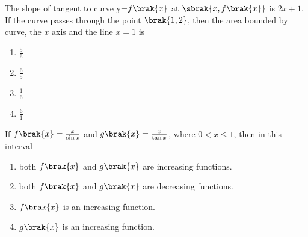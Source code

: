 \iffalse
  \title{Assignment-1}
  \author{Shivam Shilvant}
  \section{mcq-single}
\fi
\item The slope of tangent to curve y=$f\brak{x}$ at $\sbrak{x,f\brak{x}}$ is $2x + 1$. If the curve passes through the point $\brak{1,2}$, then the area bounded by curve, the $x$ axis and the line $x=1$ is
\hfill {}
\begin{multicols}{2}
\begin{enumerate}
    \item $\frac{5}{6}$
    \item $\frac{6}{5}$
    \item $\frac{1}{6}$
    \item $\frac{6}{1}$
\end{enumerate}
\end{multicols}
\item If $f\brak{x}=\frac{x}{\sin{x}}$ and $g\brak{x}=\frac{x}{\tan{x}}$, where $0<x\leq1$, then in this interval
\hfill {}
\begin{enumerate}
    \item both $f\brak{x}$ and $g\brak{x}$ are increasing functions.
    \item both $f\brak{x}$ and $g\brak{x}$ are decreasing functions.
    \item $f\brak{x}$ is an increasing function.
    \item $g\brak{x}$ is an increasing function.
\end{enumerate}

